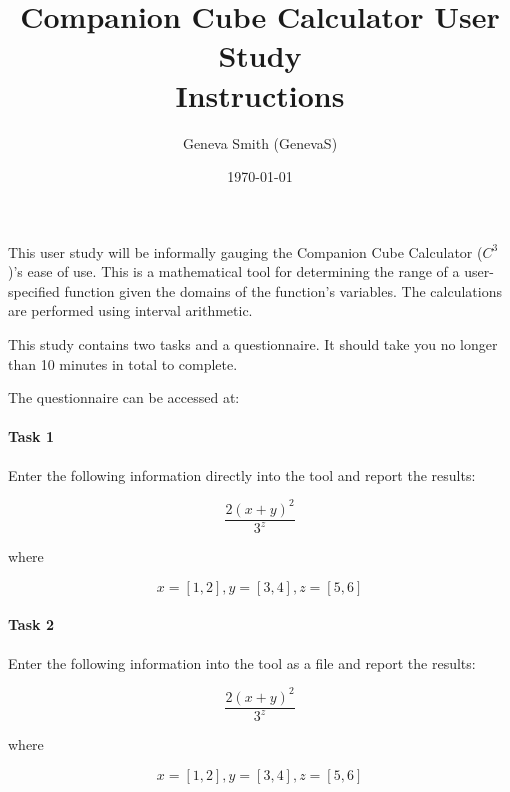 \documentclass[12pt]{article}
\title{Companion Cube Calculator User Study \\ Instructions}
\author{Geneva Smith (GenevaS)}
\date{\today}
\begin{document}
\maketitle

This user study will be informally gauging the Companion Cube Calculator 
($C^3$)'s ease of use. This is a mathematical tool for determining the range of 
a user-specified function given the domains of the function's variables. The 
calculations are performed using interval arithmetic.

This study contains two tasks and a questionnaire. It should take you no longer 
than 10 minutes in total to complete.

The questionnaire can be accessed at:
\begin{center}
	\url{}
\end{center}

\paragraph{Task 1\\}
Enter the following information directly into the tool and report the results:

$$\frac{2(x + y)^2}{3^z}$$

where

$$x = [1, 2], y = [3, 4], z = [5, 6]$$

\paragraph{Task 2\\}
Enter the following information into the tool as a file and report the results:

$$\frac{2(x + y)^2}{3^z}$$

where

$$x = [1, 2], y = [3, 4], z = [5, 6]$$
\end{document}

